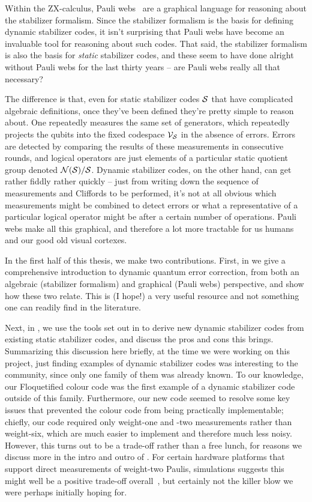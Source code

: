 Within the ZX-calculus, Pauli webs~\cite{McEwen_2023,Bombin_2024} are a graphical language for reasoning about the stabilizer formalism.
Since the stabilizer formalism is the basis for defining dynamic stabilizer codes, it isn't surprising that Pauli webs have become an invaluable tool for reasoning about such codes.
That said, the stabilizer formalism is also the basis for \textit{static} stabilizer codes, and these seem to have done alright without Pauli webs for the last thirty years -- are Pauli webs really all that necessary?

The difference is that, even for static stabilizer codes $\mathcal{S}$ that have complicated algebraic definitions, once they've been defined they're pretty simple to reason about.
One repeatedly measures the same set of generators, which repeatedly projects the qubits into the fixed codespace $\mathcal{V}_{\mathcal{S}}$ in the absence of errors.
Errors are detected by comparing the results of these measurements in consecutive rounds, and logical operators are just elements of a particular static quotient group denoted $\mathcal{N}(\mathcal{S})/\mathcal{S}$.
Dynamic stabilizer codes, on the other hand, can get rather fiddly rather quickly -- just from writing down the sequence of measurements and Cliffords to be performed, it's not at all obvious which measurements might be combined to detect errors or what a representative of a particular logical operator might be after a certain number of operations.
Pauli webs make all this graphical, and therefore a lot more tractable for us humans and our good old visual cortexes.

In the first half of this thesis, we make two contributions.
First, in  we give a comprehensive introduction to dynamic quantum error correction, from both an algebraic (stabilizer formalism) and graphical (Pauli webs) perspective, and show how these two relate.
This is (I hope!) a very useful resource and not something one can readily find in the literature.

Next, in , we use the tools set out in  to derive new dynamic stabilizer codes from existing static stabilizer codes, and discuss the pros and cons this brings.
Summarizing this discussion here briefly, at the time we were working on this project, just finding examples of dynamic stabilizer codes was interesting to the community, since only one family of them was already known.
To our knowledge, our Floquetified colour code was the first example of a dynamic stabilizer code outside of this family.
Furthermore, our new code seemed to resolve some key issues that prevented the colour code from being practically implementable; chiefly, our code required only weight-one and -two measurements rather than weight-six, which are much easier to implement and therefore much less noisy.
However, this turns out to be a trade-off rather than a free lunch, for reasons we discuss more in the intro and outro of .
For certain hardware platforms that support direct measurements of weight-two Paulis, simulations suggests this might well be a positive trade-off overall~\cite{dessertaine2025enhancedfaulttolerancephotonicquantum}, but certainly not the killer blow we were perhaps initially hoping for.


